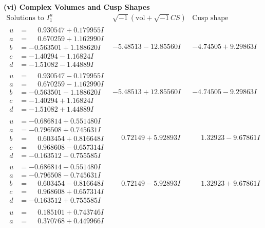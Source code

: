 \documentclass[1p]{elsarticle_modified}
\theoremstyle{definition}
\newcommand{\I}{\sqrt{-1}}
\begin{document}
\newpage\flushleft \textbf{(vi) Complex Volumes and Cusp Shapes}
$$\begin{array}{c|c|c}  
\text{Solutions to }I^u_{1}& \I (\text{vol} + \sqrt{-1}CS) & \text{Cusp shape}\\
 \hline 
\begin{aligned}
u &= \phantom{-}0.930547 + 0.179955 I \\
a &= \phantom{-}0.670259 + 1.162990 I \\
b &= -0.563501 + 1.188620 I \\
c &= -1.40294 - 1.16824 I \\
d &= -1.51082 - 1.44889 I\end{aligned}
 & -5.48513 - 12.85560 I & -4.74505 + 9.29863 I \\ \hline\begin{aligned}
u &= \phantom{-}0.930547 - 0.179955 I \\
a &= \phantom{-}0.670259 - 1.162990 I \\
b &= -0.563501 - 1.188620 I \\
c &= -1.40294 + 1.16824 I \\
d &= -1.51082 + 1.44889 I\end{aligned}
 & -5.48513 + 12.85560 I & -4.74505 - 9.29863 I \\ \hline\begin{aligned}
u &= -0.686814 + 0.551480 I \\
a &= -0.796508 + 0.745631 I \\
b &= \phantom{-}0.603454 + 0.816648 I \\
c &= \phantom{-}0.968608 - 0.657314 I \\
d &= -0.163512 - 0.755585 I\end{aligned}
 & \phantom{-}0.72149 + 5.92893 I & \phantom{-}1.32923 - 9.67861 I \\ \hline\begin{aligned}
u &= -0.686814 - 0.551480 I \\
a &= -0.796508 - 0.745631 I \\
b &= \phantom{-}0.603454 - 0.816648 I \\
c &= \phantom{-}0.968608 + 0.657314 I \\
d &= -0.163512 + 0.755585 I\end{aligned}
 & \phantom{-}0.72149 - 5.92893 I & \phantom{-}1.32923 + 9.67861 I \\ \hline\begin{aligned}
u &= \phantom{-}0.185101 + 0.743746 I \\
a &= \phantom{-}0.370768 + 0.449966 I \\

\end{aligned}
\end{array}$$
\end{document}
